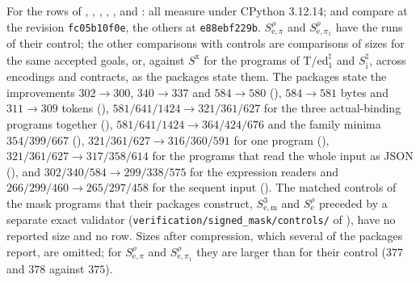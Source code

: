 For the rows of , ,
, , ,
 and : all measure under CPython
3.12.14;  and  compare at the revision
\texttt{fc05b10f0e}, the others at \texttt{e88ebf229b}. $S^{\rho}_{\mathrm e,\pi}$ and $S^{\rho}_{\mathrm e,\pi_1}$
have the runs of their control; the other comparisons with controls are comparisons of
sizes for the same accepted goals, or, against $S^{\mathrm x}$ for the programs of
T/ed$_1^{\natural}$ and $S^{\natural}_{\mathrm i}$, across encodings and contracts, as the
packages state them. The packages state the improvements $302\to 300$, $340\to 337$ and
$584\to 580$ (), $584\to 581$ bytes and $311\to 309$ tokens
(), $581/641/1424\to 321/361/627$ for the three actual-binding
programs together (), $581/641/1424\to 364/424/676$ and the family
minima $354/399/667$ (), $321/361/627\to 316/360/591$ for one program
(), $321/361/627\to 317/358/614$ for the programs that read
the whole input as JSON (), and $302/340/584\to 299/338/575$ for
the expression readers and $266/299/460\to 265/297/458$ for the sequent input
(). The matched controls of the mask programs that their
packages construct, $S^{3}_{\mathrm{e,m}}$ and $S^{\rho}_{\mathrm e}$ preceded by a separate
exact validator (\texttt{verification/signed\_mask/controls/} of ),
have no reported size and no row. Sizes after compression, which several of the packages
report, are omitted; for $S^{\rho}_{\mathrm e,\pi}$ and $S^{\rho}_{\mathrm e,\pi_1}$ they
are larger than for their control ($377$ and $378$ against $375$).

